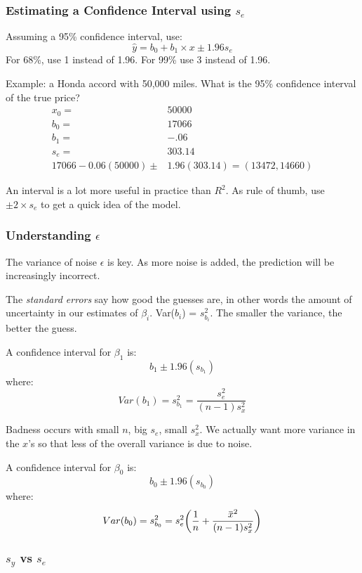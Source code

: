 \documentclass[11pt, oneside]{article}   	%
\newcommand{\overbar}[1]{\mkern 1.5mu\overline{\mkern-1.5mu#1\mkern-1.5mu}\mkern 1.5mu}
\begin{document}
\subsubsection{Estimating a Confidence Interval using $s_e$}

Assuming a 95\% confidence interval, use:
\[
\hat{y} = b_0 + b_1 \times x \pm 1.96 s_e
\]
For 68\%, use 1 instead of 1.96. For 99\% use 3 instead of 1.96.

Example: a Honda accord with 50,000 miles. What is the 95\% confidence interval of the true price?
\begin{align*}
x_0 =& 50000\\
b_0 =& 17066 \\
b_1 =& -.06 \\
s_e =& 303.14 \\
17066 - 0.06 (50000) \pm& 1.96 (303.14) = (13472,14660)
\end{align*}

An interval is a lot more useful in practice than $R^2$. As rule of thumb, use $\pm 2 \times s_e$ to get a quick idea of the model.

\subsubsection{Understanding $\epsilon$}

The variance of noise $\epsilon$ is key. As more noise is added, the prediction will be increasingly incorrect. 

The \textit{standard errors} say how good the guesses are, in other words the amount of uncertainty in our estimates of $\beta_i$. Var($b_i$) = $s^2_{b_i}$. The smaller the variance, the better the guess.

A confidence interval for $\beta_1$ is:
\[
b_1 \pm 1.96 (s_{b_1})
\]
where:
\[
Var(b_1) = s^2_{b_1} = \frac{s^2_e} {(n-1) s_x^2}
\]

Badness occurs with small $n$, big $s_e$, small $s^2_x$. We actually want more variance in the $x$'s so that less of the overall variance is due to noise. 


A confidence interval for $\beta_0$ is:
\[
b_0 \pm 1.96 (s_{b_0})
\]
where:
\[
Var(b_0) = s^2_{b_0} = s^2_e \bigg( \frac{1}{n} + \frac{\overbar{x}^2} {(n-1) s_x^2} \bigg)
\]

\subsubsection{$s_y$ vs $s_e$}
\end{document}
